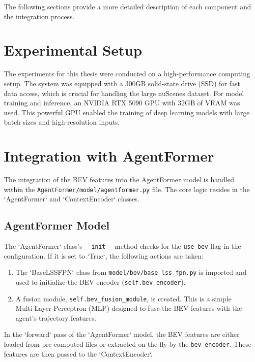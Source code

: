 The following sections provide a more detailed description of each component and the integration process.

\section{Experimental Setup}

The experiments for this thesis were conducted on a high-performance computing setup. The system was equipped with a 300GB solid-state drive (SSD) for fast data access, which is crucial for handling the large nuScenes dataset. For model training and inference, an NVIDIA RTX 5090 GPU with 32GB of VRAM was used. This powerful GPU enabled the training of deep learning models with large batch sizes and high-resolution inputs.

\section{Integration with AgentFormer}

The integration of the BEV features into the AgentFormer model is handled within the {\sloppy\texttt{AgentFormer/model/agentformer.py}} file. The core logic resides in the `AgentFormer` and `ContextEncoder` classes.

\subsection{AgentFormer Model}

The `AgentFormer` class's {\sloppy\texttt{\_\_init\_\_}} method checks for the {\sloppy\texttt{use\_bev}} flag in the configuration. If it is set to `True`, the following actions are taken:

\begin{enumerate}
    \item The `BaseLSSFPN` class from {\sloppy\texttt{model/bev/base\_lss\_fpn.py}} is imported and used to initialize the BEV encoder ({\sloppy\texttt{self.bev\_encoder}}).
    \item A fusion module, {\sloppy\texttt{self.bev\_fusion\_module}}, is created. This is a simple Multi-Layer Perceptron (MLP) designed to fuse the BEV features with the agent's trajectory features.
\end{enumerate}

In the `forward` pass of the `AgentFormer` model, the BEV features are either loaded from pre-computed files or extracted on-the-fly by the {\sloppy\texttt{bev\_encoder}}. These features are then passed to the `ContextEncoder`.

